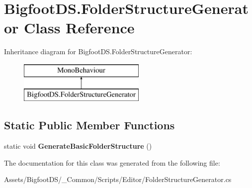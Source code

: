 \hypertarget{class_bigfoot_d_s_1_1_folder_structure_generator}{}\section{Bigfoot\+D\+S.\+Folder\+Structure\+Generator Class Reference}
\label{class_bigfoot_d_s_1_1_folder_structure_generator}
Inheritance diagram for Bigfoot\+D\+S.\+Folder\+Structure\+Generator\+:\begin{figure}[H]
\begin{center}
\leavevmode
\includegraphics[height=2.000000cm]{class_bigfoot_d_s_1_1_folder_structure_generator}
\end{center}
\end{figure}
\subsection*{Static Public Member Functions}
\begin{DoxyCompactItemize}
\item 
\mbox{\label{class_bigfoot_d_s_1_1_folder_structure_generator_aaddc799c445ab04cd16ff7386598e58d}} 
static void {\bfseries Generate\+Basic\+Folder\+Structure} ()
\end{DoxyCompactItemize}


The documentation for this class was generated from the following file\+:\begin{DoxyCompactItemize}
\item 
Assets/\+Bigfoot\+D\+S/\+\_\+\+Common/\+Scripts/\+Editor/Folder\+Structure\+Generator.\+cs\end{DoxyCompactItemize}
